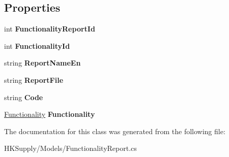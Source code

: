 \subsection*{Properties}
\begin{DoxyCompactItemize}
\item 
\mbox{\label{class_h_k_supply_1_1_models_1_1_functionality_report_a3749af96c16893323617cb8e9ab60d72}} 
int {\bfseries Functionality\+Report\+Id}
\item 
\mbox{\label{class_h_k_supply_1_1_models_1_1_functionality_report_a1428aa5e04ac22ebd52710f58cbb8cd1}} 
int {\bfseries Functionality\+Id}
\item 
\mbox{\label{class_h_k_supply_1_1_models_1_1_functionality_report_a80fb8760005bcd322d5b2ea3aec7da1b}} 
string {\bfseries Report\+Name\+En}
\item 
\mbox{\label{class_h_k_supply_1_1_models_1_1_functionality_report_aa1b253d493b593787b2971b8a2e9b5cf}} 
string {\bfseries Report\+File}
\item 
\mbox{\label{class_h_k_supply_1_1_models_1_1_functionality_report_a262b775e8d457562b885c58a55fca3ea}} 
string {\bfseries Code}
\item 
\mbox{\label{class_h_k_supply_1_1_models_1_1_functionality_report_ac3f6ad2d1d67c5f54ccd56a762c0f4df}} 
\mbox{\hyperlink{class_h_k_supply_1_1_models_1_1_functionality}{Functionality}} {\bfseries Functionality}
\end{DoxyCompactItemize}


The documentation for this class was generated from the following file\+:\begin{DoxyCompactItemize}
\item 
H\+K\+Supply/\+Models/Functionality\+Report.\+cs\end{DoxyCompactItemize}

